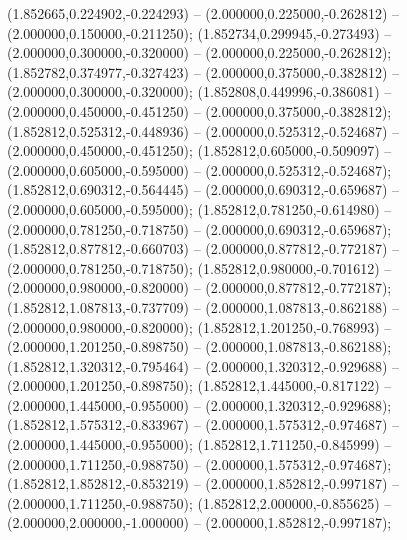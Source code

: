  (1.852665,0.224902,-0.224293) -- (2.000000,0.225000,-0.262812) -- (2.000000,0.150000,-0.211250);
 (1.852734,0.299945,-0.273493) -- (2.000000,0.300000,-0.320000) -- (2.000000,0.225000,-0.262812);
 (1.852782,0.374977,-0.327423) -- (2.000000,0.375000,-0.382812) -- (2.000000,0.300000,-0.320000);
 (1.852808,0.449996,-0.386081) -- (2.000000,0.450000,-0.451250) -- (2.000000,0.375000,-0.382812);
 (1.852812,0.525312,-0.448936) -- (2.000000,0.525312,-0.524687) -- (2.000000,0.450000,-0.451250);
 (1.852812,0.605000,-0.509097) -- (2.000000,0.605000,-0.595000) -- (2.000000,0.525312,-0.524687);
 (1.852812,0.690312,-0.564445) -- (2.000000,0.690312,-0.659687) -- (2.000000,0.605000,-0.595000);
 (1.852812,0.781250,-0.614980) -- (2.000000,0.781250,-0.718750) -- (2.000000,0.690312,-0.659687);
 (1.852812,0.877812,-0.660703) -- (2.000000,0.877812,-0.772187) -- (2.000000,0.781250,-0.718750);
 (1.852812,0.980000,-0.701612) -- (2.000000,0.980000,-0.820000) -- (2.000000,0.877812,-0.772187);
 (1.852812,1.087813,-0.737709) -- (2.000000,1.087813,-0.862188) -- (2.000000,0.980000,-0.820000);
 (1.852812,1.201250,-0.768993) -- (2.000000,1.201250,-0.898750) -- (2.000000,1.087813,-0.862188);
 (1.852812,1.320312,-0.795464) -- (2.000000,1.320312,-0.929688) -- (2.000000,1.201250,-0.898750);
 (1.852812,1.445000,-0.817122) -- (2.000000,1.445000,-0.955000) -- (2.000000,1.320312,-0.929688);
 (1.852812,1.575312,-0.833967) -- (2.000000,1.575312,-0.974687) -- (2.000000,1.445000,-0.955000);
 (1.852812,1.711250,-0.845999) -- (2.000000,1.711250,-0.988750) -- (2.000000,1.575312,-0.974687);
 (1.852812,1.852812,-0.853219) -- (2.000000,1.852812,-0.997187) -- (2.000000,1.711250,-0.988750);
 (1.852812,2.000000,-0.855625) -- (2.000000,2.000000,-1.000000) -- (2.000000,1.852812,-0.997187);
